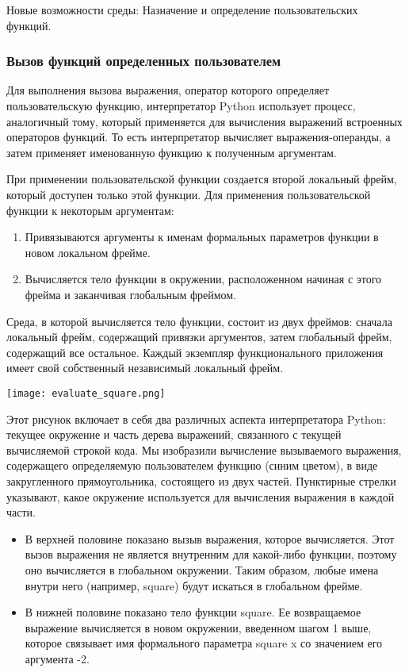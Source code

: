 Новые возможности среды: Назначение и определение пользовательских функций.

\subsubsection{Вызов функций определенных пользователем}

Для выполнения вызова выражения, оператор которого определяет пользовательскую функцию, интерпретатор Python использует процесс, аналогичный тому, который применяется для вычисления выражений встроенных операторов функций.
То есть интерпретатор вычисляет выражения-операнды, а затем применяет именованную функцию к полученным аргументам.

При применении пользовательской функции создается второй локальный фрейм, который доступен только этой функции. Для применения пользовательской функции к некоторым аргументам:
\begin{enumerate}
  \item Привязываются аргументы к именам формальных параметров функции в новом локальном фрейме.
  \item Вычисляется тело функции в окружении, расположенном начиная с этого фрейма и заканчивая глобальным фреймом.
\end{enumerate}
Среда, в которой вычисляется тело функции, состоит из двух фреймов: сначала локальный фрейм, содержащий привязки аргументов, затем глобальный фрейм, содержащий все остальное. Каждый экземпляр функционального приложения имеет свой собственный независимый локальный фрейм.
\begin{center}
  \texttt{[image: evaluate\_square.png]}
\end{center}

Этот рисунок включает в себя два различных аспекта интерпретатора Python: текущее окружение и часть дерева выражений, связанного с текущей вычисляемой строкой кода.
Мы изобразили вычисление вызываемого выражения, содержащего определяемую пользователем функцию (синим цветом), в виде закругленного прямоугольника, состоящего из двух частей.
Пунктирные стрелки указывают, какое окружение используется для вычисления выражения в каждой части.
\begin{itemize}
  \item В верхней половине показано вызыв выражения, которое вычисляется. Этот вызов выражения не является внутренним для какой-либо функции, поэтому оно вычисляется в глобальном окружении. Таким образом, любые имена внутри него (например, square) будут искаться в глобальном фрейме.
  \item В нижней половине показано тело функции square. Ее возвращаемое выражение вычисляется в новом окружении, введенном шагом 1 выше, которое связывает имя формального параметра square x со значением его аргумента -2.
\end{itemize}

